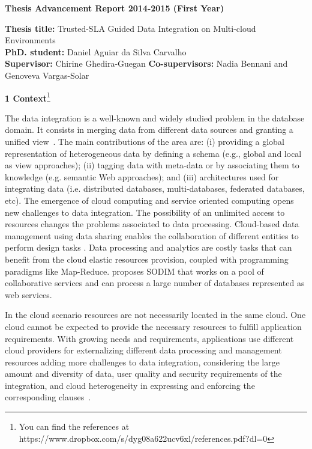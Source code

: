 \documentclass[11pt,a4paper,oneside]{report}
\author{Daniel Aguiar da Silva Carvalho}
\begin{document}
\begin{center}
\textbf{\large{Thesis Advancement Report 2014-2015 (First Year)}}
\end{center}

\begin{flushleft}
\textbf{Thesis title:} Trusted-SLA Guided Data Integration on Multi-cloud Environments \\
\textbf{PhD. student:} Daniel Aguiar da Silva Carvalho \\
\textbf{Supervisor:} Chirine Ghedira-Guegan \textbf{Co-supervisors:} Nadia Bennani and Genoveva Vargas-Solar 
\end{flushleft}

\begin{flushleft}
\textbf{1 Context}\footnote{You can find the references at https://www.dropbox.com/s/dyg08a622ucv6xl/references.pdf?dl=0} \\
\end{flushleft} 
The data integration is a well-known and widely studied problem in the database domain. 
It consists in merging data from different data sources and granting a unified view~\cite{Lenzerini:2002}. 
%
The main contributions of the area are: (i) providing a global  representation of heterogeneous data  by defining a schema (e.g., global and local as view approaches); (ii) tagging data with meta-data or by associating them to knowledge (e.g. semantic Web approaches); and (iii) architectures used for integrating data (i.e. distributed databases, multi-databases,  federated databases, etc).
%
The emergence of cloud computing and service oriented computing opens new challenges to data integration. 
The possibility of an unlimited access to resources  changes the problems associated to data processing. Cloud-based data management using data sharing  enables the collaboration of different entities to perform design tasks \cite{Gonzalez:2010,Gonzalez:2010b}. Data processing and analytics are costly tasks that can benefit from the cloud elastic resources provision, coupled with  programming paradigms like Map-Reduce. \cite{078} proposes SODIM that works on a pool of collaborative services and can process a large number of databases represented as web services. 


In the cloud scenario resources are not necessarily located in the same cloud. One cloud cannot be expected to provide the necessary resources to fulfill application requirements. 
With growing needs and requirements, applications use different cloud providers for externalizing different data processing and management resources
adding more challenges to data integration, considering the large amount and diversity of data, user quality and security requirements of the integration, and cloud heterogeneity in expressing and enforcing the corresponding clauses~\cite{Dustdar:2012}.
\end{document}
